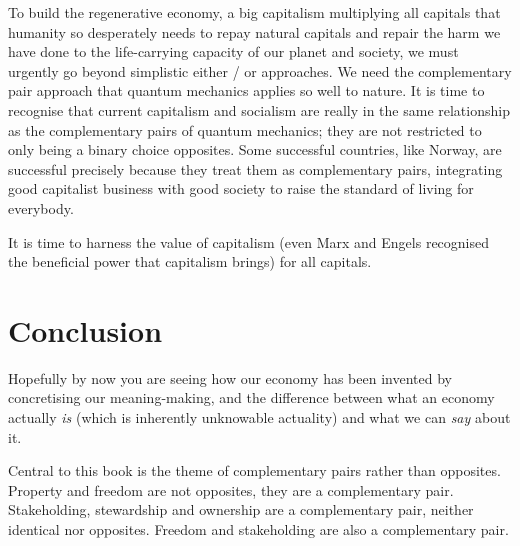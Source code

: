 To build the regenerative economy, a big capitalism multiplying all capitals that humanity so desperately needs to repay natural capitals and repair the harm we have done to the life-carrying capacity of our planet and society, we must urgently go beyond simplistic either / or approaches. We need the complementary pair approach that quantum mechanics applies so well to nature. It is time to recognise that current capitalism and socialism are really in the same relationship as the complementary pairs of quantum mechanics; they are not restricted to only being a binary choice opposites. Some successful countries, like Norway, are successful precisely because they treat them as complementary pairs, integrating good capitalist business with good society to raise the standard of living for everybody.


It is time to harness the value of capitalism (even Marx and Engels\cite{marx-engels-communist} recognised the beneficial power that capitalism brings) for all capitals.
\section{Conclusion}
Hopefully by now you are seeing how our economy has been invented by concretising our meaning\hyp{}making, and the difference between what an economy actually \emph{is} (which is inherently unknowable actuality) and what we can \emph{say} about it. 


Central to this book is the theme of complementary pairs rather than opposites. Property and freedom are not opposites, they are a complementary pair. Stakeholding, stewardship and ownership are a complementary pair, neither identical nor opposites. Freedom and stakeholding are also a complementary pair.